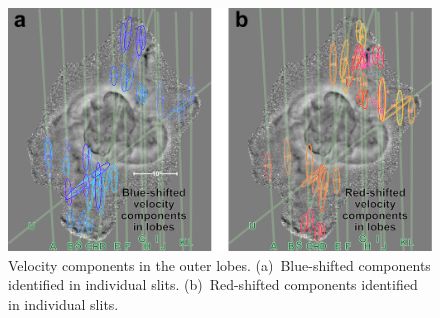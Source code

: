 \documentclass[useAMS, usenatbib]{mnras}
\begin{document}
\begin{figure}
  \centering
  \includegraphics[width=\linewidth]
  {figs/turtle-lobes-simplified-components}
  \caption{
    Velocity components in the outer lobes.
    (a)~Blue-shifted components identified in individual slits.
    (b)~Red-shifted components identified in individual slits.
  }
  \label{fig:outer-lobe-components}
\end{figure}
\end{document}
